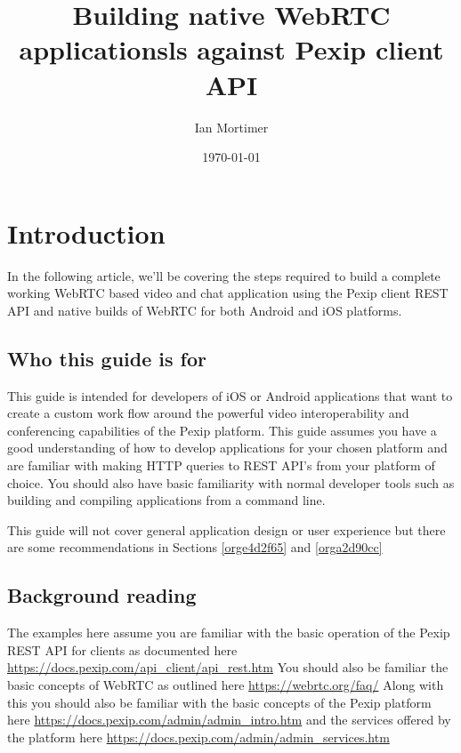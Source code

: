\documentclass[a4paper,11pt]{article}
\author{Ian Mortimer}
\date{\today}
\title{Building native WebRTC applicationsls against Pexip client API}
\begin{document}
\maketitle
\tableofcontents

\clearpage

\section{Introduction}
\label{sec:orgc51bdba}

In the following article, we'll be covering the steps required to
build a complete working WebRTC based video and chat application using
the Pexip client REST API and native builds of WebRTC for both
Android and iOS platforms.

\subsection{Who this guide is for}
\label{sec:orgb49f273}

This guide is intended for developers of iOS or Android applications
that want to create a custom work flow around the powerful video
interoperability and conferencing capabilities of the Pexip platform.
This guide assumes you have a good understanding of how to develop
applications for your chosen platform and are familiar with making
HTTP queries to REST API's from your platform of choice.  You should
also have basic familiarity with normal developer tools such as
building and compiling applications from a command line.

This guide will not cover general application design or user
experience but there are some recommendations in Sections
\ref{orge4d2f65} and \ref{orga2d90cc}

\subsection{Background reading}
\label{sec:orga37ff65}

The examples here assume you are familiar with the basic operation of
the Pexip REST API for clients as documented here
\url{https://docs.pexip.com/api\_client/api\_rest.htm} You should also be
familiar the basic concepts of WebRTC as outlined here
\url{https://webrtc.org/faq/} Along with this you should also be familiar
with the basic concepts of the Pexip platform here
\url{https://docs.pexip.com/admin/admin\_intro.htm} and the services offered
by the platform here \url{https://docs.pexip.com/admin/admin\_services.htm}
\end{document}
